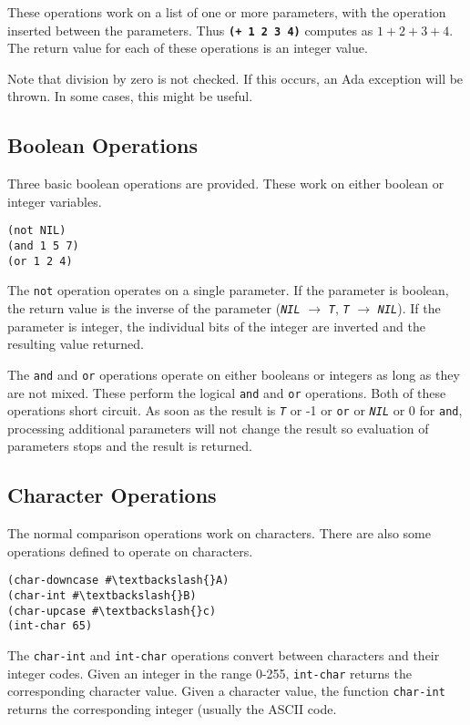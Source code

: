 \documentclass[10pt, openany]{book}
\newcommand{\operation}[1]{\textbf{\texttt{#1}}}
\newcommand{\function}[1]{\texttt{#1}}
\newcommand{\constant}[1]{\emph{\texttt{#1}}}
\begin{document}
These operations work on a list of one or more parameters, with the operation inserted between the parameters.  Thus \operation{(+ 1 2 3 4)} computes as $1+2+3+4$.  The return value for each of these operations is an integer value.

Note that division by zero is not checked.  If this occurs, an Ada exception will be thrown.  In some cases, this might be useful.

\subsection{Boolean Operations}
Three basic boolean operations are provided.  These work on either boolean or integer variables.
\begin{lstlisting}
(not NIL)
(and 1 5 7)
(or 1 2 4)
\end{lstlisting}

The \function{not} operation operates on a single parameter.  If the parameter is boolean, the return value is the inverse of the parameter (\constant{NIL} $\rightarrow$ \constant{T}, \constant{T} $\rightarrow$ \constant{NIL}).  If the parameter is integer, the individual bits of the integer are inverted and the resulting value returned.

The \function{and} and \function{or} operations operate on either booleans or integers as long as they are not mixed.  These perform the logical \function{and} and \function{or} operations.  Both of these operations short circuit.  As soon as the result is \constant{T} or -1 or \function{or} or \constant{NIL} or 0 for \function{and},  processing additional parameters will not change the result so evaluation of parameters stops and the result is returned.

\subsection{Character Operations}
The normal comparison operations work on characters.  There are also some operations defined to operate on characters.
\begin{lstlisting}
(char-downcase #\textbackslash{}A)
(char-int #\textbackslash{}B)
(char-upcase #\textbackslash{}c)
(int-char 65)
\end{lstlisting}

The \function{char-int} and \function{int-char} operations convert between characters and their integer codes.  Given an integer in the range 0-255, \function{int-char} returns the corresponding character value.  Given a character value, the function \function{char-int} returns the corresponding integer (usually the ASCII code.
\end{document}
